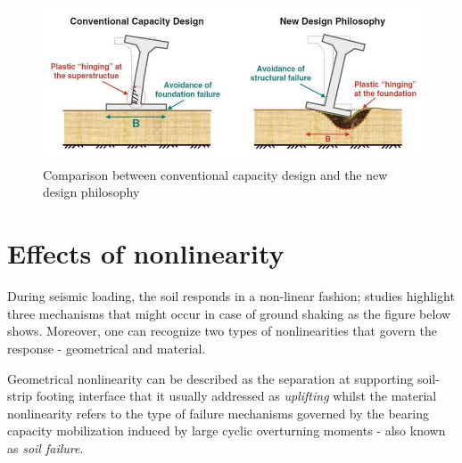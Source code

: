 \documentclass[10pt,a4paper]{report}
\begin{document}
\begin{figure}[h!]
	\centering
	\includegraphics[width=0.7\linewidth]{"new_phil"}
	\caption{Comparison between conventional capacity design and the new design philosophy}
	\label{comp}
\end{figure}
\section{Effects of nonlinearity}
During seismic loading, the soil responds in a non-linear fashion; studies highlight three mechanisms that might occur in case of ground shaking as the figure below shows. Moreover, one can recognize two types of nonlinearities that govern the response - geometrical and material.

Geometrical nonlinearity can be described as the separation at supporting soil-strip footing interface that it usually addressed as \textit{uplifting} whilst the material nonlinearity refers to the type of failure mechanisms governed by the bearing capacity mobilization induced by large cyclic overturning moments - also known as \textit{soil failure}. 
\end{document}
